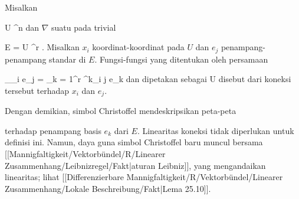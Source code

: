 
{}
{

Misalkan

\mavergleichskette
{\vergleichskette
{ U
}
{ \subseteq }{ \R^n
}
{  }{
}
{    }{
}
{   }{
}
}
{}{}{}
dan $\nabla$ suatu
pada
trivial

\mavergleichskette
{\vergleichskette
{ E
}
{ = }{ U \times \R^r
}
{  }{
}
{    }{
}
{   }{
}
}
{}{}{.}
Misalkan $x_i$ koordinat-koordinat pada $U$ dan $e_j$ penampang-penampang standar di $E$. Fungsi-fungsi yang ditentukan oleh persamaan

\mavergleichskettedisp
{\vergleichskette
{ \nabla_{\partial_i } e_j
}
{ =} { \sum_{k = 1}^r \Gamma^k_{i j}  e_k
}
{ } {
}
{ } {
}
{ } {}
}
{}{}{}
dan dipetakan sebagai
 { U } {\R
} {}
disebut
dari koneksi tersebut terhadap $x_i$ dan $e_j$.

}

Dengan demikian, simbol Christoffel mendeskripsikan peta-peta

 {  }

terhadap penampang basis $e_k$ dari $E$. Linearitas koneksi tidak diperlukan untuk definisi ini. Namun, daya guna simbol Christoffel baru muncul bersama
[[Mannigfaltigkeit/Vektorbündel/R/Linearer Zusammenhang/Leibnizregel/Fakt|aturan Leibniz]],
yang mengandaikan linearitas; lihat
[[Differenzierbare Mannigfaltigkeit/R/Vektorbündel/Linearer Zusammenhang/Lokale Beschreibung/Fakt|Lema 25.10]].

